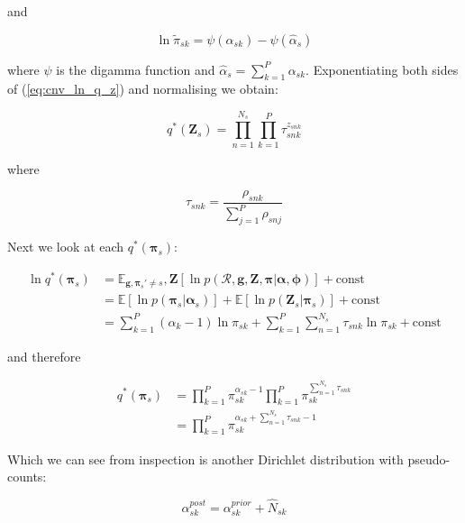 \documentclass{article}
\begin{document}
and

\begin{equation}
\label{eq:cnv_ex_ln_pi}
\ln \tilde{\pi}_{sk} = \psi(\alpha_{sk}) - \psi(\hat{\alpha}_s)
\end{equation}

where $\psi$ is the digamma function and $\hat{\alpha}_{s} = \sum_{k = 1}^P \alpha_{sk}$. Exponentiating both sides of (\ref{eq:cnv_ln_q_z}) and normalising we obtain:

\begin{equation}
\label{eq:cnv_q_z}
q^*(\boldsymbol{Z}_s) = \prod_{n = 1}^{N_s} \prod_{k = 1}^P \tau_{snk}^{z_{snk}}
\end{equation}

where

\begin{equation}
\label{eq:cnv_tau}
\tau_{snk} = \frac{\rho_{snk}}{\sum_{j = 1}^P \rho_{snj}}
\end{equation}

Next we look at each $q^*(\boldsymbol{\pi}_s)$:

\begin{align}
\label{eq:cnv_ln_q_pi}
\ln q^*(\boldsymbol{\pi}_s) &= \mathbb{E}_{\boldsymbol{g}, \boldsymbol{\pi}_s' \ne s}, \boldsymbol{Z} [\ln p(\mathcal{R}, \boldsymbol{g}, \boldsymbol{Z}, \boldsymbol{\pi} | \boldsymbol{\alpha}, \boldsymbol{\phi})] + \text{const} \\
&= \mathbb{E}[\ln p(\boldsymbol{\pi}_s | \boldsymbol{\alpha}_s)] + \mathbb{E}[\ln p(\boldsymbol{Z}_s | \boldsymbol{\pi}_s)] + \text{const} \\
&= \sum_{k = 1}^P (\alpha_k - 1) \ln \pi_{sk} + \sum_{k = 1}^P \sum_{n = 1}^{N_s} \tau_{snk} \ln \pi_{sk} + \text{const}
\end{align}

and therefore

\begin{align}
\label{eq:cnv_q_pi}
q^*(\boldsymbol{\pi}_s) &= \prod_{k = 1}^P \pi_{sk}^{\alpha_{sk} - 1} \prod_{k = 1}^P \pi_{sk}^{\sum_{n = 1}^{N_s} \tau_{snk}} \\
&=  \prod_{k = 1}^P \pi_{sk}^{\alpha_{sk} + \sum_{n = 1}^{N_s} \tau_{snk} - 1}
\end{align}

Which we can see from inspection is another Dirichlet distribution with pseudo-counts:

\begin{equation}
\label{eq:cnv_new_counts}
\alpha_{sk}^{post} = \alpha_{sk}^{prior} + \hat{N}_{sk}
\end{equation}
\end{document}
